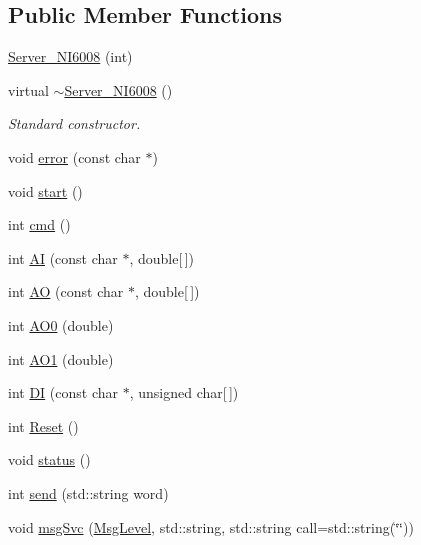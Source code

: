 \subsection*{Public Member Functions}
\begin{DoxyCompactItemize}
\item 
\hyperlink{classServer__NI6008_afdb7ded0c7463c53829529aa9864c9da}{Server\_\-NI6008} (int)
\item 
virtual \hyperlink{classServer__NI6008_a1c9bf761d7bae3ee267363fb851171b7}{$\sim$Server\_\-NI6008} ()
\begin{DoxyCompactList}\small\item\em Standard constructor. \item\end{DoxyCompactList}\item 
void \hyperlink{classServer__NI6008_a7bcfa6ba683c63b68c624644ccfb8597}{error} (const char $\ast$)
\item 
void \hyperlink{classServer__NI6008_ae3ac1bbf922a2475f41dfd97482af152}{start} ()
\item 
int \hyperlink{classServer__NI6008_ac659132ba000bf628a5f5b696ae133ee}{cmd} ()
\item 
int \hyperlink{classServer__NI6008_a94705879717d5bcf129899e96be81675}{AI} (const char $\ast$, double\mbox{[}$\,$\mbox{]})
\item 
int \hyperlink{classServer__NI6008_adde2efeb68363f67abb6d76c7ca2d761}{AO} (const char $\ast$, double\mbox{[}$\,$\mbox{]})
\item 
int \hyperlink{classServer__NI6008_a53ef808ed00d7b7105b62c2ce34faaec}{AO0} (double)
\item 
int \hyperlink{classServer__NI6008_a130bb6bca52d5c779491c51975e6ffda}{AO1} (double)
\item 
int \hyperlink{classServer__NI6008_a76b7491d11244e43a2fdb6d4783bd0f8}{DI} (const char $\ast$, unsigned char\mbox{[}$\,$\mbox{]})
\item 
int \hyperlink{classServer__NI6008_a0495ec12779e4b9bfdda3d60c0ef20aa}{Reset} ()
\item 
void \hyperlink{classServer__NI6008_aae0469228b36fc7085223ad301ffe073}{status} ()
\item 
int \hyperlink{classServer__NI6008_af47694911afff2feb37a091d9fcab4fa}{send} (std::string word)
\item 
void \hyperlink{classServer__NI6008_a140d5f91d6c0f4fb963ecf747e44df78}{msgSvc} (\hyperlink{classServer__NI6008_af1e3e3bac26355a746b5d2e548fe25be}{MsgLevel}, std::string, std::string call=std::string(\char`\"{}\char`\"{}))

\end{DoxyCompactItemize}
